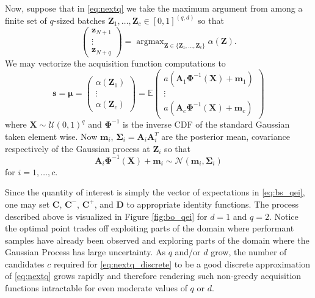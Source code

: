 \documentclass[graybox]{svmult}
\begin{document}
Now, suppose that in \eqref{eq:nextq} we take the maximum argument from among a finite set of $q$-sized batches $\boldsymbol{Z}_1,\dots,\boldsymbol{Z}_c \in [0,1]^{(q, d)}$ so that 
\begin{equation}
    \begin{pmatrix}\boldsymbol{z}_{N+1} \\ \vdots \\ \boldsymbol{z}_{N+q}\end{pmatrix} = \mathop{\text{argmax}}_{\boldsymbol{Z} \in \{\boldsymbol{Z}_1,\dots,\boldsymbol{Z}_c\}}\alpha(\boldsymbol{Z}).
    \label{eq:nextq_discrete}
\end{equation}
We may vectorize the acquisition function computations to 
\begin{equation}
    \boldsymbol{s} = \boldsymbol{\mu} = \begin{pmatrix} \alpha(\boldsymbol{Z}_1) \\ \vdots \\ \alpha(\boldsymbol{Z}_c)\end{pmatrix} = \mathbb{E}\begin{pmatrix}a\left(\boldsymbol{A}_1\boldsymbol{\Phi}^{-1}(\boldsymbol{X})+\boldsymbol{m}_1\right) \\ \vdots \\ a\left(\boldsymbol{A}_c\boldsymbol{\Phi}^{-1}(\boldsymbol{X})+\boldsymbol{m}_c\right)\end{pmatrix}
    \label{eq:bs_qei}
\end{equation}
where $\boldsymbol{X} \sim \mathcal{U}(0,1)^q$ and $\boldsymbol{\Phi}^{-1}$ is the inverse CDF of the standard Gaussian taken element wise. Now $\boldsymbol{m}_i$, $\boldsymbol{\Sigma}_i = \boldsymbol{A}_i\boldsymbol{A}_i^T$ are the posterior mean, covariance respectively of the Gaussian process at $\boldsymbol{Z}_i$ so that 
$$\boldsymbol{A}_i\boldsymbol{\Phi}^{-1}(\boldsymbol{X})+\boldsymbol{m}_i \sim \mathcal{N}\left(\boldsymbol{m}_i,\boldsymbol{\Sigma}_i\right)$$
for $i=1,\dots,c$.

Since the quantity of interest is simply the vector of expectations in \eqref{eq:bs_qei}, one may set $\boldsymbol{C}$, $\boldsymbol{C}^-$, $\boldsymbol{C}^+$, and $\boldsymbol{D}$ to appropriate identity functions. The process described above is visualized in Figure \ref{fig:bo_qei} for $d=1$ and $q=2$. Notice the optimal point trades off exploiting parts of the domain where performant samples have already been observed and  exploring parts of the domain where the Gaussian Process has large uncertainty.  As $q$ and/or $d$ grow, the number of candidates $c$ required for \eqref{eq:nextq_discrete} to be a good discrete approximation of \eqref{eq:nextq} grows rapidly and therefore rendering such non-greedy acquisition functions intractable for even moderate values of $q$ or $d$.
\end{document}
